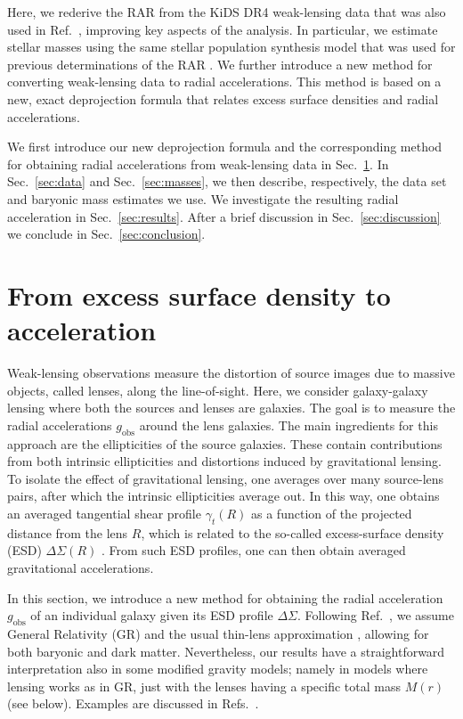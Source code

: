 \documentclass[a4paper,11pt]{article}
\begin{document}
Here, we rederive the RAR from the KiDS DR4 weak-lensing data \citep{Kuijken2019,Giblin2021,Bilicki2021} that was also used in Ref.~\cite{Brouwer2021},
  improving key aspects of the analysis.
In particular, we estimate stellar masses using the same stellar population synthesis model \citep{Schombert2014} that was used for previous determinations of the RAR \citep{Lelli2016,Lelli2017b}.
We further introduce a new method for converting weak-lensing data to radial accelerations.
This method is based on a new, exact deprojection formula that relates excess surface densities and radial accelerations.

We first introduce our new deprojection formula and the corresponding method for obtaining radial accelerations from weak-lensing data in Sec.~\ref{sec:newmethod}.
In Sec.~\ref{sec:data} and Sec.~\ref{sec:masses}, we then describe, respectively, the data set and baryonic mass estimates we use.
We investigate the resulting radial acceleration in Sec.~\ref{sec:results}.
After a brief discussion in Sec.~\ref{sec:discussion} we conclude in Sec.~\ref{sec:conclusion}.

\section{From excess surface density to acceleration}
\label{sec:newmethod}
\label{sec:newmethod:individual}

Weak-lensing observations measure the distortion of source images due to massive objects, called lenses, along the line-of-sight.
Here, we consider galaxy-galaxy lensing where both the sources and lenses are galaxies.
The goal is to measure the radial accelerations $g_{\mathrm{obs}}$ around the lens galaxies.
The main ingredients for this approach are the ellipticities of the source galaxies.
These contain contributions from both intrinsic ellipticities and distortions induced by gravitational lensing.
To isolate the effect of gravitational lensing, one averages over many source-lens pairs, after which the intrinsic ellipticities average out.
In this way, one obtains an averaged tangential shear profile $\gamma_t(R)$ as a function of the projected distance from the lens $R$, which is related to the so-called excess-surface density (ESD) $\Delta \Sigma(R)$ \citep{Kaiser1995,Bartelmann1995}.
From such ESD profiles, one can then obtain averaged gravitational accelerations.

In this section, we introduce a new method for obtaining the radial acceleration $g_{\mathrm{obs}}$ of an individual galaxy given its ESD profile $\Delta \Sigma$.
Following Ref.~\cite{Brouwer2021}, we assume General Relativity (GR) and the usual thin-lens approximation \citep{Bartelmann2001}, allowing for both baryonic and dark matter.
Nevertheless, our results have a straightforward interpretation also in some modified gravity models;
namely in models where lensing works as in GR, just with the lenses having a specific total mass $M(r)$ (see below).
Examples are discussed in Refs.~\cite{Mistele2023,Mistele2023c,Milgrom2013}.
\end{document}
